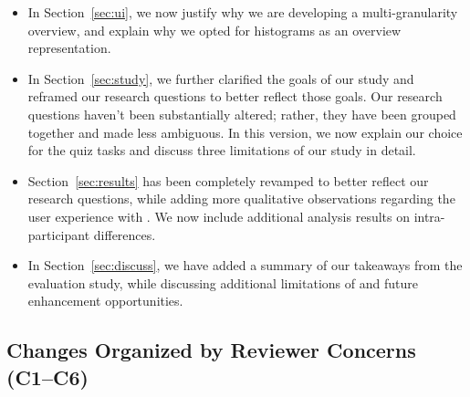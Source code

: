 {\begin{itemize}
third design consideration 
for \noah more clearly
(\textbf{DC3})---focusing on motivating the binning
mechanism. 
\item In Section~\ref{sec:ui}, 
we now justify why we are developing a 
multi-granularity overview,
and explain why 
we opted for histograms as an overview representation. 
\item 
In Section~\ref{sec:study}, 
we further clarified the goals of our study
and reframed our research questions to 
better reflect those goals. 
Our research questions haven't been substantially altered;
rather, they have been grouped together and made less
ambiguous. In this version,
we now explain our choice
for the quiz tasks and discuss 
three limitations of our study in detail. 
\item Section~\ref{sec:results} has been completely
revamped to better reflect our research questions,
while adding more qualitative observations 
regarding the user experience with \noah. 
We now
include additional analysis results on intra-participant differences. 
\item In Section~\ref{sec:discuss}, we have added a summary of our takeaways from the evaluation study, while discussing additional limitations of \noah and future enhancement opportunities. 
\end{itemize}
\subsection*{Changes Organized by Reviewer Concerns (C1--C6)}
}

